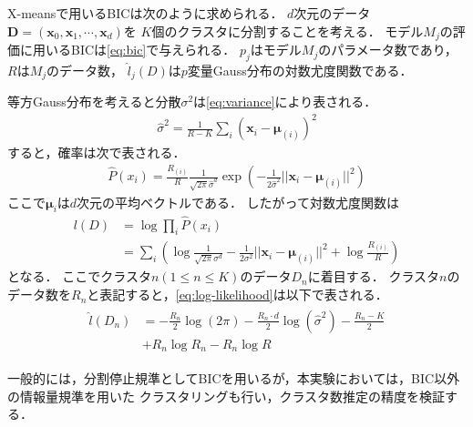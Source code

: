 X-meansで用いるBICは次のように求められる．
$d$次元のデータ${\bm D}=({\bm x_0}, {\bm x_1}, \cdots, {\bm x_d})$を
$K$個のクラスタに分割することを考える．
モデル$M_j$の評価に用いるBICは\eqref{eq:bic}で与えられる．
$p_j$はモデル$M_j$のパラメータ数であり，$R$は$M_j$のデータ数，
$\hat{l}_j(D)$は$p$変量Gauss分布の対数尤度関数である．

等方Gauss分布を考えると分散$\sigma^2$は\eqref{eq:variance}により表される．
\begin{align}
  \label{eq:variance}
  \hat{\sigma}^2 = \frac{1}{R-K}\sum_i\left({\bm x}_i-{\bm \mu}_{(i)}\right)^2
\end{align}
すると，確率は次で表される．
\begin{align}
  \label{eq:gaussian-distribution}
  \hat{P}(x_i) = \frac{R_{(i)}}{R}\frac{1}{\sqrt{2\pi}\hat{\sigma}^d}
    \exp\left(-\frac{1}{2\hat{\sigma}^2}||{\bm x}_i-{\bm \mu}_{(i)}||^2\right)
\end{align}
ここで${\bm \mu}_{i}$は$d$次元の平均ベクトルである．
したがって対数尤度関数は
\begin{align}
  \label{eq:log-likelihood}
  l(D) &= \log \prod_i \hat{P}(x_i) \\\nonumber
  &= \sum_i \left( \log\frac{1}{\sqrt{2\pi}\sigma^d}-\frac{1}{2\sigma^2}||{\bm x}_i-{\bm \mu}_{(i)}||^2 + \log\frac{R_{(i)}}{R} \right)
\end{align}
となる．
ここでクラスタ$n (1 \leq n \leq K)$のデータ$D_n$に着目する．
クラスタ$n$のデータ数を$R_n$と表記すると，\eqref{eq:log-likelihood}は以下で表される．
\begin{align}
  \begin{split}
    \hat{l}(D_n) &= -\frac{R_n}{2}\log(2\pi) - \frac{R_n \cdot d}{2}\log(\hat{\sigma}^2) -
    \frac{R_n - K}{2}\\ &
    + R_n\log R_n - R_n \log R
  \end{split}
\end{align}

一般的には，分割停止規準としてBICを用いるが，本実験においては，BIC以外の情報量規準を用いた
クラスタリングも行い，クラスタ数推定の精度を検証する．
